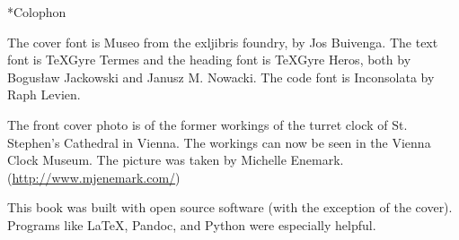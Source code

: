 \begin{chapter}*{Colophon}

\noindent The cover font is Museo from the exljibris foundry, by Jos 
Buivenga.  The text font is \TeX Gyre Termes and the heading font is \TeX Gyre
Heros, both by Bogus\l{}aw Jackowski and Janusz M. Nowacki.  The code font is
Inconsolata by Raph Levien.

The front cover photo is of the former workings of the turret clock of 
St. Stephen's Cathedral in Vienna. The workings can now be seen in the Vienna
Clock Museum. The picture was taken by Michelle Enemark. (\url{http://www.mjenemark.com/})

This book was built with open source software (with the exception of the
cover).  Programs like \LaTeX, Pandoc, and Python were especially helpful.

\end{chapter}

\pagebreak
\thispagestyle{empty}
\mbox{}

